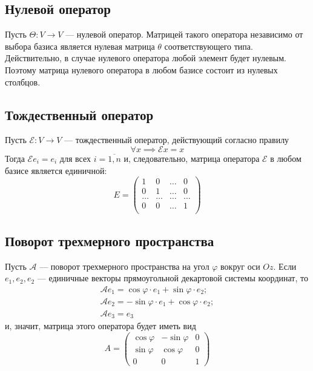 \documentclass[a5paper, 11pt]{extbook}
\theoremstyle{definition}
\theoremstyle{definition}
\theoremstyle{definition}
\begin{document}
\subsection{Нулевой оператор}

Пусть \(\Theta : V \to V\) — нулевой оператор. Матрицей такого оператора независимо от выбора базиса является нулевая матрица \(\theta\) соответствующего типа. Действительно, в случае нулевого оператора любой элемент будет нулевым. Поэтому матрица нулевого оператора в любом базисе состоит из нулевых столбцов.

\subsection{Тождественный оператор}

Пусть \(\mathcal{E}: V \to V\) — тождественный оператор, действующий согласно правилу
\[
    \forall x \implies \mathcal{E} x = x
\]
Тогда \(\mathcal{E} e_i = e_i\) для всех \(i = \overline{1, n}\) и, следовательно, матрица оператора \(\mathcal{E}\) в любом базисе является единичной:
\[
    E =
    \begin{pmatrix}
        1      & 0      & \ldots & 0      \\
        0      & 1      & \ldots & 0      \\
        \ldots & \ldots & \ldots & \ldots \\
        0      & 0      & \ldots & 1      \\
    \end{pmatrix}
\]

\subsection{Поворот трехмерного пространства}

Пусть \(\mathcal{A}\) — поворот трехмерного пространства на угол \(\varphi\) вокруг оси \(Oz\). Если \(e_1, e_2, e_2\) — единичные векторы прямоугольной декартовой системы координат, то
\begin{gather*}
    \mathcal{A} e_1 = \cos \varphi \cdot e_1 + \sin \varphi \cdot e_2; \\
    \mathcal{A} e_2 = - \sin \varphi \cdot e_1 + \cos \varphi \cdot e_2; \\
    \mathcal{A} e_3 = e_3
\end{gather*}
и, значит, матрица этого оператора будет иметь вид
\[
    A =
    \begin{pmatrix}
        \cos \varphi & - \sin \varphi & 0 \\
        \sin \varphi & \cos \varphi   & 0 \\
        0            & 0              & 1
    \end{pmatrix}
\]
\end{document}
